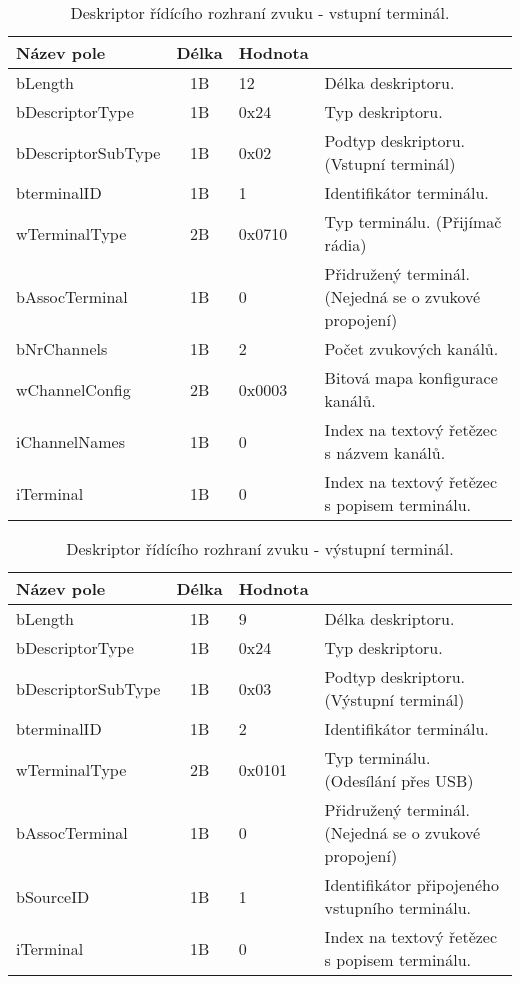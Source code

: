 \clearpage

\begin{table}[t]
\begin{center}
\begin{tabular}{|l|c|l|l|}
\hline 
Název pole & Délka & Hodnota &  \\ 
\hline
bLength & 1B & 12 & Délka deskriptoru.\\
\hline
bDescriptorType & 1B & 0x24 & Typ deskriptoru. \\
\hline
bDescriptorSubType & 1B & 0x02 & Podtyp deskriptoru. (Vstupní terminál)\\
\hline
bterminalID & 1B & 1 & Identifikátor terminálu.\\
\hline
wTerminalType & 2B & 0x0710 & Typ terminálu. (Přijímač rádia)\\
\hline
bAssocTerminal & 1B & 0 & Přidružený terminál. (Nejedná se o zvukové propojení)\\
\hline
bNrChannels & 1B & 2 & Počet zvukových kanálů.\\
\hline
wChannelConfig & 2B & 0x0003 & Bitová mapa konfigurace kanálů.\\
\hline
iChannelNames & 1B & 0 & Index na textový řetězec s názvem kanálů.\\
\hline
iTerminal & 1B & 0 & Index na textový řetězec s popisem terminálu.\\
\hline
\end{tabular}  
\end{center}
\caption{Deskriptor řídícího rozhraní zvuku - vstupní terminál.}
\label{tab:usb-aud-ctrl-in} 
\end{table}

\begin{table}[t]
\begin{center}
\begin{tabular}{|l|c|l|l|}
\hline 
Název pole & Délka & Hodnota &  \\ 
\hline
bLength & 1B & 9 & Délka deskriptoru.\\
\hline
bDescriptorType & 1B & 0x24 & Typ deskriptoru. \\
\hline
bDescriptorSubType & 1B & 0x03 & Podtyp deskriptoru. (Výstupní terminál)\\
\hline
bterminalID & 1B & 2 & Identifikátor terminálu.\\
\hline
wTerminalType & 2B & 0x0101 & Typ terminálu. (Odesílání přes USB)\\
\hline
bAssocTerminal & 1B & 0 & Přidružený terminál. (Nejedná se o zvukové propojení)\\
\hline
bSourceID & 1B & 1 & Identifikátor připojeného vstupního terminálu. \\
\hline
iTerminal & 1B & 0 & Index na textový řetězec s popisem terminálu.\\
\hline
\end{tabular}  

\end{center}
\caption{Deskriptor řídícího rozhraní zvuku - výstupní terminál.}
\label{tab:usb-aud-ctrl-out} 
\end{table}
\FloatBarrier

